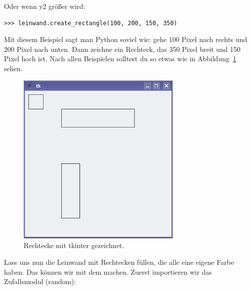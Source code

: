 \noindent
Oder wenn y2 größer wird:

\begin{Verbatim}[frame=single]
>>> leinwand.create_rectangle(100, 200, 150, 350)
\end{Verbatim}

Mit diesem Beispiel sagt man Python soviel wie: gehe 100 Pixel nach rechts und 200 Pixel nach unten. Dann zeichne ein Rechteck, das 350 Pixel breit und 150 Pixel hoch ist. Nach allen Beispielen solltest du so etwas wie in Abbildung~\ref{fig33} sehen.

\begin{figure}
\begin{center}
\includegraphics[width=80mm]{images/figure33}
\end{center}
\caption{Rechtecke mit tkinter gezeichnet.}\label{fig33}
\end{figure}

Lass uns nun die Leinwand mit Rechtecken füllen, die alle eine eigene Farbe haben. Das können wir mit dem  machen. Zuerst importieren wir das Zufallsmodul (random):


